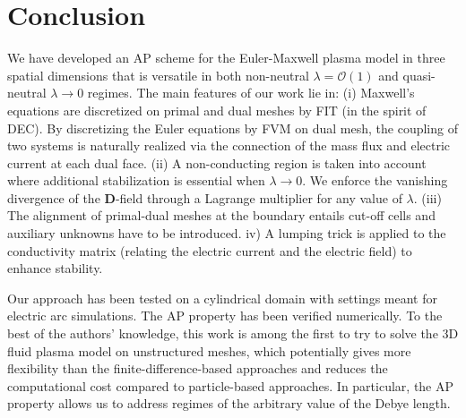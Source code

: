 \documentclass{article}
\begin{document}
\section{Conclusion}
We have developed an AP scheme for the Euler-Maxwell plasma model in three spatial dimensions that is versatile in both non-neutral $\lambda = \mathcal{O}(1)$ and quasi-neutral $\lambda \rightarrow 0$ regimes. The main features of our work lie in: (i) Maxwell's equations are discretized on primal and dual meshes by FIT (in the spirit of DEC). By discretizing the Euler equations by FVM on dual mesh, the coupling of two systems is naturally realized via the connection of the mass flux and electric current at each dual face. (ii) A non-conducting region is taken into account where additional stabilization is essential when $\lambda \rightarrow 0$. We enforce the vanishing divergence of the $\mathbf{D}$-field through a Lagrange multiplier for any value of $\lambda$. (iii) The alignment of primal-dual meshes at the boundary entails cut-off cells and auxiliary unknowns have to be introduced. iv) A lumping trick is applied to the conductivity matrix (relating the electric current and the electric field) to enhance stability.   

Our approach has been tested on a cylindrical domain with settings meant for electric arc simulations. The AP property has been verified numerically. To the best of the authors' knowledge, this work is among the first to try to solve the 3D fluid plasma model on unstructured meshes, which potentially gives more flexibility than the finite-difference-based approaches and reduces the computational cost compared to particle-based approaches. In particular, the AP property allows us to address regimes of the arbitrary value of the Debye length. 


\end{document}
